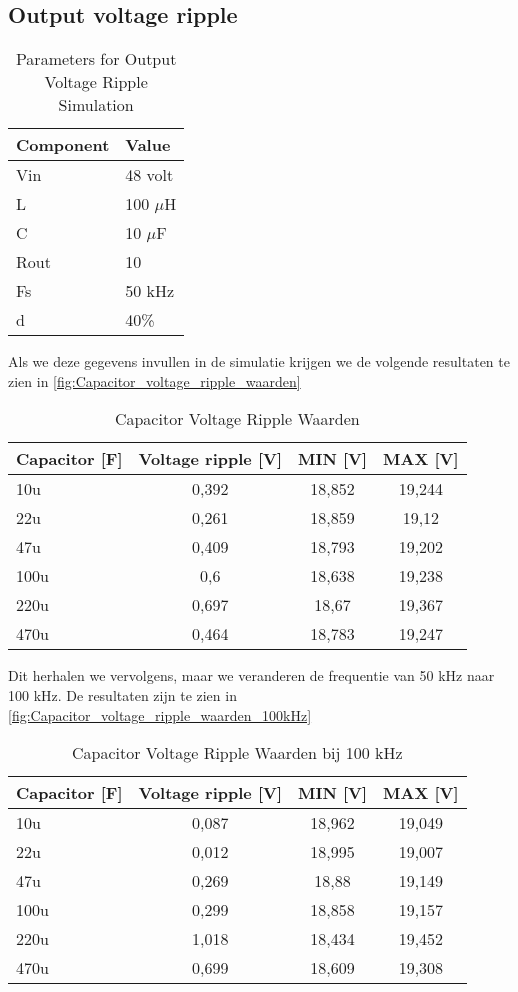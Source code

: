 \subsection{Output voltage ripple}
\begin{table}[h!]
\centering
\begin{tabular}{|l|l|}
\hline
\textbf{Component} & \textbf{Value} \\
\hline
Vin  & 48 volt \\
L    & 100 $\mu$H \\
C    & 10 $\mu$F \\
Rout & 10 \\
Fs   & 50 kHz \\
d    & 40\% \\
\hline
\end{tabular}
\caption{Parameters for Output Voltage Ripple Simulation}
\label{fig:Output_voltage_ripple_simulation}
\end{table}
Als we deze gegevens invullen in de simulatie krijgen we de volgende resultaten te zien in \autoref{fig:Capacitor_voltage_ripple_waarden}
\begin{table}[h!]
\centering
\begin{tabular}{|l|c|c|c|}
\hline
\textbf{Capacitor [F]} & \textbf{Voltage ripple [V]} & \textbf{MIN [V]} & \textbf{MAX [V]} \\
\hline
10u   & 0,392 & 18,852 & 19,244 \\
22u   & 0,261 & 18,859 & 19,12  \\
47u   & 0,409 & 18,793 & 19,202 \\
100u  & 0,6   & 18,638 & 19,238 \\
220u  & 0,697 & 18,67  & 19,367 \\
470u  & 0,464 & 18,783 & 19,247 \\
\hline
\end{tabular}
\caption{Capacitor Voltage Ripple Waarden}
\label{fig:Capacitor_voltage_ripple_waarden}
\end{table}

Dit herhalen we vervolgens, maar we veranderen de frequentie van 50 kHz naar 100 kHz. De resultaten zijn te zien in \autoref{fig:Capacitor_voltage_ripple_waarden_100kHz}
\begin{table}[h!]
\centering
\begin{tabular}{|l|c|c|c|}
\hline
\textbf{Capacitor [F]} & \textbf{Voltage ripple [V]} & \textbf{MIN [V]} & \textbf{MAX [V]} \\
\hline
10u   & 0,087 & 18,962 & 19,049 \\
22u   & 0,012 & 18,995 & 19,007 \\
47u   & 0,269 & 18,88  & 19,149 \\
100u  & 0,299 & 18,858 & 19,157 \\
220u  & 1,018 & 18,434 & 19,452 \\
470u  & 0,699 & 18,609 & 19,308 \\
\hline
\end{tabular}
\caption{Capacitor Voltage Ripple Waarden bij 100 kHz}
\label{fig:Capacitor_voltage_ripple_waarden_100kHz}
\end{table}